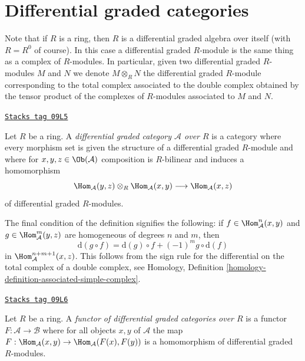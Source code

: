 \section{Differential graded categories}
\label{dga-section-dga-categories}
Note that if $R$ is a ring, then $R$ is a differential graded algebra
over itself (with $R = R^0$ of course). In this case a differential
graded $R$-module is the same thing as a complex of $R$-modules.
In particular, given two differential graded $R$-modules $M$ and $N$
we denote $M \otimes_R N$ the differential graded $R$-module
corresponding to the total complex associated to the double
complex obtained by the tensor product of the complexes of $R$-modules
associated to $M$ and $N$.

\begin{definition}
\label{dga-definition-dga-category}
\href{https://stacks.math.columbia.edu/tag/09L5}{\texttt{Stacks tag 09L5}}

Let $R$ be a ring. A {\it differential graded category $\mathcal{A}$
over $R$} is a category where every morphism set is given the structure
of a differential graded $R$-module and where for
$x, y, z \in \Ob(\mathcal{A})$ composition is $R$-bilinear and induces
a homomorphism
$$
\Hom_\mathcal{A}(y, z) \otimes_R \Hom_\mathcal{A}(x, y)
\longrightarrow
\Hom_\mathcal{A}(x, z)
$$
of differential graded $R$-modules.
\end{definition}

The final condition of the definition signifies the following:
if $f \in \Hom_\mathcal{A}^n(x, y)$ and
$g \in \Hom_\mathcal{A}^m(y, z)$ are homogeneous
of degrees $n$ and $m$, then
$$
\text{d}(g \circ f) = \text{d}(g) \circ f + (-1)^mg \circ \text{d}(f)
$$
in $\Hom_\mathcal{A}^{n + m + 1}(x, z)$. This follows from the sign
rule for the differential on the total complex of a double complex, see
Homology, Definition \ref{homology-definition-associated-simple-complex}.

\begin{definition}
\label{dga-definition-functor-dga-categories}
\href{https://stacks.math.columbia.edu/tag/09L6}{\texttt{Stacks tag 09L6}}

Let $R$ be a ring. A {\it functor of differential graded categories over $R$}
is a functor $F : \mathcal{A} \to \mathcal{B}$ where for all objects
$x, y$ of $\mathcal{A}$ the map
$F : \Hom_\mathcal{A}(x, y) \to \Hom_\mathcal{A}(F(x), F(y))$
is a homomorphism of differential graded $R$-modules.
\end{definition}

